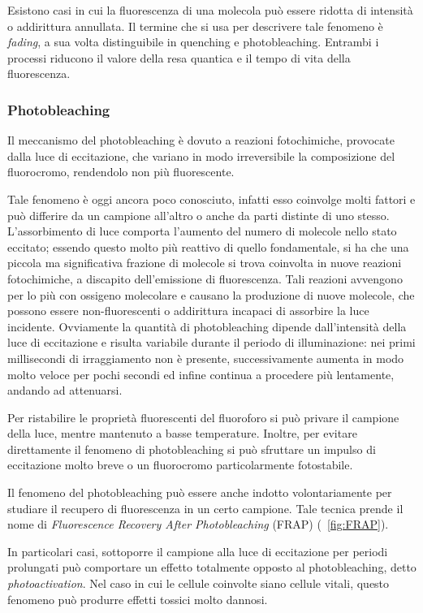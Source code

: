 Esistono casi in cui la fluorescenza di una molecola può essere ridotta di intensità o addirittura annullata. 
Il termine che si usa per descrivere tale fenomeno è \textit{fading}, a sua volta distinguibile in quenching e photobleaching.
Entrambi i processi riducono il valore della resa quantica e il tempo di vita della fluorescenza.

\subsubsection*{Photobleaching}
Il meccanismo del photobleaching è dovuto a reazioni fotochimiche, provocate dalla luce di eccitazione, che variano in modo irreversibile la composizione del fluorocromo, rendendolo non più fluorescente. 

Tale fenomeno è oggi ancora poco conosciuto, infatti esso coinvolge molti fattori e può differire da un campione all'altro o anche da parti distinte di uno stesso.
L'assorbimento di luce comporta l'aumento del numero di molecole nello stato eccitato; essendo questo molto più reattivo di quello fondamentale, si ha che una piccola ma significativa frazione di molecole si trova coinvolta in nuove reazioni fotochimiche, a discapito dell'emissione di fluorescenza. 
Tali reazioni avvengono per lo più con ossigeno molecolare e causano la produzione di nuove molecole, che possono essere non-fluorescenti o addirittura incapaci di assorbire la luce incidente.
Ovviamente la quantità di photobleaching dipende dall'intensità della luce di eccitazione e risulta variabile durante il periodo di illuminazione: nei primi millisecondi di irraggiamento non è presente, successivamente aumenta in modo molto veloce per pochi secondi ed infine continua a procedere  più lentamente, andando ad attenuarsi.

Per ristabilire le proprietà fluorescenti del fluoroforo si può privare il campione della luce, mentre mantenuto a basse temperature. 
Inoltre, per evitare direttamente il fenomeno di photobleaching si può sfruttare un impulso di eccitazione molto breve o un fluorocromo particolarmente fotostabile.

Il fenomeno del photobleaching può essere anche indotto volontariamente per studiare il recupero di fluorescenza in un certo campione. 
Tale tecnica prende il nome di \textit{Fluorescence Recovery After Photobleaching} (FRAP) (\figurename~\ref{fig:FRAP}).

In particolari casi, sottoporre il campione alla luce di eccitazione per periodi prolungati può comportare un effetto totalmente opposto al photobleaching, detto \textit{photoactivation}. 
Nel caso in cui le cellule coinvolte siano cellule vitali, questo fenomeno può produrre effetti tossici molto dannosi.

